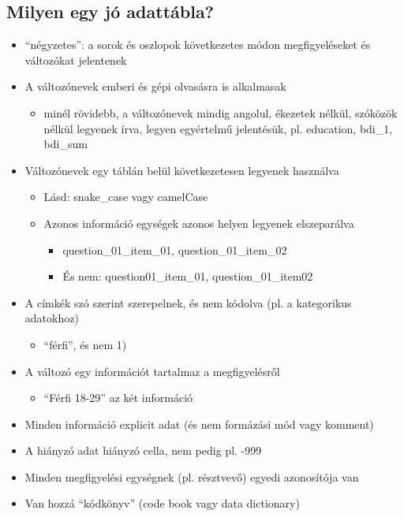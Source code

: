 \documentclass[
  letterpaper,
  DIV=11,
  numbers=noendperiod]{scrreprt}
\providecommand{\tightlist}{%
  \setlength{\itemsep}{0pt}\setlength{\parskip}{0pt}}\usepackage{longtable,booktabs,array}
\begin{document}
\hypertarget{milyen-egy-juxf3-adattuxe1bla}{%
\subsection{Milyen egy jó
adattábla?}\label{milyen-egy-juxf3-adattuxe1bla}}

\begin{itemize}
\item
  ``négyzetes'': a sorok és oszlopok következetes módon megfigyeléseket
  és változókat jelentenek
\item
  A változónevek emberi és gépi olvasásra is alkalmasak

  \begin{itemize}
  \tightlist
  \item
    minél rövidebb, a változónevek mindig angolul, ékezetek nélkül,
    szóközök nélkül legyenek írva, legyen egyértelmű jelentésük, pl.
    education, bdi\_1, bdi\_sum
  \end{itemize}
\item
  Változónevek egy táblán belül következetesen legyenek használva

  \begin{itemize}
  \item
    Lásd: snake\_case vagy camelCase
  \item
    Azonos információ egységek azonos helyen legyenek elszeparálva

    \begin{itemize}
    \item
      question\_01\_item\_01, question\_01\_item\_02
    \item
      És nem: question01\_item\_01, question\_01\_item02
    \end{itemize}
  \end{itemize}
\item
  A címkék szó szerint szerepelnek, és nem kódolva (pl. a kategorikus
  adatokhoz)

  \begin{itemize}
  \tightlist
  \item
    ``férfi'', és nem 1)
  \end{itemize}
\item
  A változó egy információt tartalmaz a megfigyelésről

  \begin{itemize}
  \tightlist
  \item
    ``Férfi 18-29'' az két információ
  \end{itemize}
\item
  Minden információ explicit adat (és nem formázási mód vagy komment)
\item
  A hiányzó adat hiányzó cella, nem pedig pl. -999
\item
  Minden megfigyelési egységnek (pl. résztvevő) egyedi azonosítója van
\item
  Van hozzá ``kódkönyv'' (code book vagy data dictionary)


\end{itemize}
\end{document}
